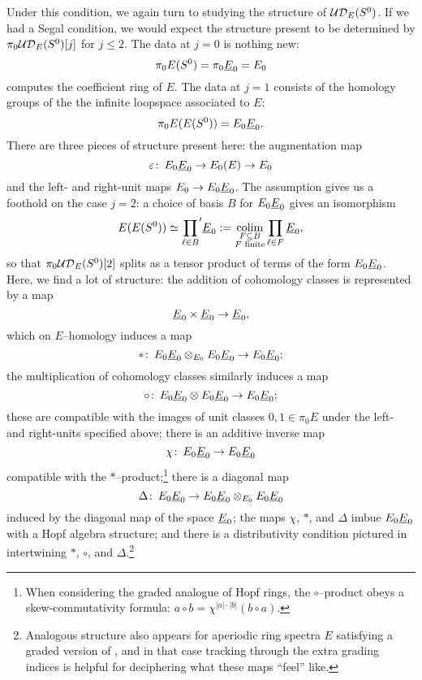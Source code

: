Under this condition, we again turn to studying the structure of \(\mathcal{UD}_E(S^0)\).  If we had a Segal condition, we would expect the structure present to be determined by \(\pi_0 \mathcal{UD}_E(S^0)[j]\) for \(j \le 2\).  The data at \(j = 0\) is nothing new: \[\pi_0 E(S^0) = \pi_0 \OS{E}{0} = E_0\] computes the coefficient ring of \(E\).  The data at \(j = 1\) consists of the homology groups of the the infinite loopspace associated to \(E\): \[\pi_0 E(E(S^0)) = E_0 \OS{E}{0}.\]  There are three pieces of structure present here: the augmentation map \[\eps\co E_0 \OS{E}{0} \to E_0(E) \to E_0\] and the left- and right-unit maps \(E_0 \to E_0 \OS{E}{0}\).  The assumption {\UFH} gives us a foothold on the case \(j = 2\): a choice of basis \(B\) for \(E_0 \OS{E}{0}\) gives an isomorphism \[E(E(S^0)) \simeq {\prod_{\ell \in B}}' \OS{E}{0} := \colim_{\substack{F \subseteq B \\ \text{\(F\) finite}}} \prod_{\ell \in F} \OS{E}{0},\] so that \(\pi_0 \mathcal{UD}_E(S^0)[2]\) splits as a tensor product of terms of the form \(E_0 \OS{E}{0}\).  Here, we find a lot of structure: the addition of cohomology classes is represented by a map \[\OS E 0 \times \OS E 0 \to \OS E 0,\] which on \(E\)--homology induces a map \[\ast\co E_0 \OS{E}{0} \otimes_{E_0} E_0 \OS{E}{0} \to E_0 \OS{E}{0};\] the multiplication of cohomology classes similarly induces a map \[\circ\co E_0 \OS{E}{0} \otimes E_0 \OS{E}{0} \to E_0 \OS{E}{0};\] these are compatible with the images of unit classes \(0, 1 \in \pi_0 E\) under the left- and right-units specified above; there is an additive inverse map \[\chi\co E_0 \OS{E}{0} \to E_0 \OS{E}{0}\] compatible with the \(\ast\)--product;\footnote{When considering the graded analogue of Hopf rings, the \(\circ\)--product obeys a skew-commutativity formula: \(a \circ b = \chi^{|a| \cdot |b|}(b \circ a)\).} there is a diagonal map \[\Delta\co E_0 \OS{E}{0} \to E_0 \OS{E}{0} \otimes_{E_0} E_0 \OS{E}{0}\] induced by the diagonal map of the space $\OS{E}{0}$; the maps \(\chi\), \(\ast\), and \(\Delta\) imbue \(E_0 \OS{E}{0}\) with a Hopf algebra structure; and there is a distributivity condition pictured in  intertwining \(\ast\), \(\circ\), and \(\Delta\).\footnote{Analogous structure also appears for aperiodic ring spectra \(E\) satisfying a graded version of {\UFH}, and in that case tracking through the extra grading indices is helpful for deciphering what these maps ``feel'' like.}


